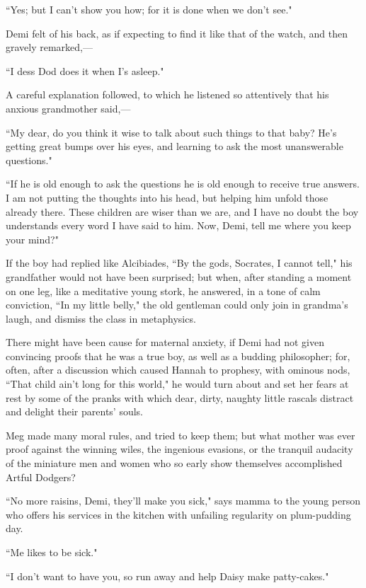 ``Yes; but I can't show you how; for it is done when we
don't see."

Demi felt of his back, as if expecting to find it like that of the
watch, and then gravely remarked,---

``I dess Dod does it when I's asleep."

A careful explanation followed, to which he listened so attentively that
his anxious grandmother said,---

``My dear, do you think it wise to talk about such things to that baby?
He's getting great bumps over his eyes, and learning to
ask the most unanswerable questions."

``If he is old enough to ask the questions he is old enough to receive
true answers. I am not putting the thoughts into his head, but helping
him unfold those already there. These children are wiser than we are,
and I have no doubt the boy understands every word I have said to him.
Now, Demi, tell me where you keep your mind?"

If the boy had replied like Alcibiades, ``By the gods, Socrates, I cannot
tell," his grandfather would not have been surprised; but when, after
standing a moment on one leg, like a meditative young stork, he
answered, in a tone of calm conviction, ``In my little belly," the old
gentleman could only join in grandma's laugh, and
dismiss the class in metaphysics.

There might have been cause for maternal anxiety, if Demi had not given
convincing proofs that he was a true boy, as well as a budding
philosopher; for, often, after a discussion which caused Hannah to
prophesy, with ominous nods, ``That child ain't long for
this world," he would turn about and set her fears at rest by some of
the pranks with which dear, dirty, naughty little rascals distract and
delight their parents' souls.

Meg made many moral rules, and tried to keep them; but what mother was
ever proof against the winning wiles, the ingenious evasions, or the
tranquil audacity of the miniature men and women who so early show
themselves accomplished Artful Dodgers?

``No more raisins, Demi, they'll make you sick," says
mamma to the young person who offers his services in the kitchen with
unfailing regularity on plum-pudding day.

``Me likes to be sick."

``I don't want to have you, so run away and help Daisy
make patty-cakes."

